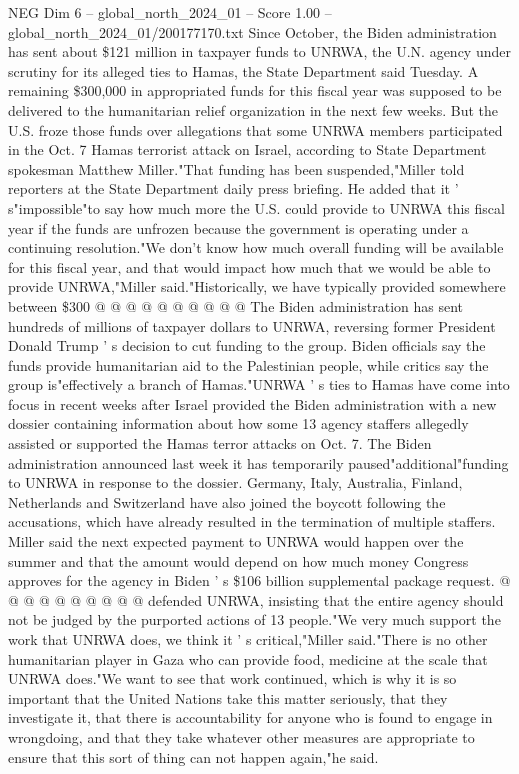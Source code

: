 \begin{textsample}{NEG Dim 6 – global\_north\_2024\_01 – Score 1.00 – global\_north\_2024\_01/200177170.txt}  \label{ex:f6_neg_329}
Since October, the Biden administration has sent about \$121 million in taxpayer funds to UNRWA, the U.N. agency under scrutiny for its alleged ties to Hamas, the State Department said Tuesday.
A remaining \$300,000 in appropriated funds for this fiscal year was supposed to be delivered to the humanitarian relief organization in the next few weeks.
But the U.S. froze those funds over allegations that some UNRWA members participated in the Oct. 7 Hamas terrorist attack on Israel, according to State Department spokesman Matthew Miller."That funding has been suspended,"Miller told reporters at the State Department daily press briefing.
He added that it ' s"impossible"to say how much more the U.S. could provide to UNRWA this fiscal year if the funds are unfrozen because the government is operating under a continuing resolution."We don't know how much overall funding will be available for this fiscal year, and that would impact how much that we would be able to provide UNRWA,"Miller said."Historically, we have typically provided somewhere between \$300 @ @ @ @ @ @ @ @ @ @ The Biden administration has sent hundreds of millions of taxpayer dollars to UNRWA, reversing former President Donald Trump ' s decision to cut funding to the group.
Biden officials say the funds provide humanitarian aid to the Palestinian people, while critics say the group is"effectively a branch of Hamas."UNRWA ' s ties to Hamas have come into focus in recent weeks after Israel provided the Biden administration with a new dossier containing information about how some 13 agency staffers allegedly assisted or supported the Hamas terror attacks on Oct. 7.
The Biden administration announced last week it has temporarily paused"additional"funding to UNRWA in response to the dossier.
Germany, Italy, Australia, Finland, Netherlands and Switzerland have also joined the boycott following the accusations, which have already resulted in the termination of multiple staffers.
Miller said the next expected payment to UNRWA would happen over the summer and that the amount would depend on how much money Congress approves for the agency in Biden ' s \$106 billion supplemental package request. @ @ @ @ @ @ @ @ @ @ defended UNRWA, insisting that the entire agency should not be judged by the purported actions of 13 people."We very much support the work that UNRWA does, we think it ' s critical,"Miller said."There is no other humanitarian player in Gaza who can provide food, medicine at the scale that UNRWA does."We want to see that work continued, which is why it is so important that the United Nations take this matter seriously, that they investigate it, that there is accountability for anyone who is found to engage in wrongdoing, and that they take whatever other measures are appropriate to ensure that this sort of thing can not happen again,"he said.

\end{textsample}
